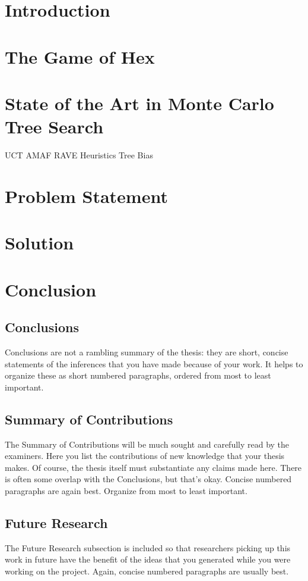 \documentclass[10pt,a4paper]{report}
\author{James Pettit}
\begin{document}
\section{Introduction}
\section{The Game of Hex}
\section{State of the Art in Monte Carlo Tree Search}
UCT
AMAF
RAVE
Heuristics
Tree Bias
\section{Problem Statement}
\section{Solution}
\section{Conclusion}
\subsection{Conclusions}
Conclusions are not a rambling summary of the thesis: they are short, concise statements of the inferences that you have made because of your work. It helps to organize these as short numbered paragraphs, ordered from most to least important.
\subsection{Summary of Contributions}
The Summary of Contributions will be much sought and carefully read by the examiners. Here you list the contributions of new knowledge that your thesis makes. Of course, the thesis itself must substantiate any claims made here. There is often some overlap with the Conclusions, but that's okay. Concise numbered paragraphs are again best. Organize from most to least important.
\subsection{Future Research}
The Future Research subsection is included so that researchers picking up this work in future have the benefit of the ideas that you generated while you were working on the project. Again, concise numbered paragraphs are usually best.
\end{document}
